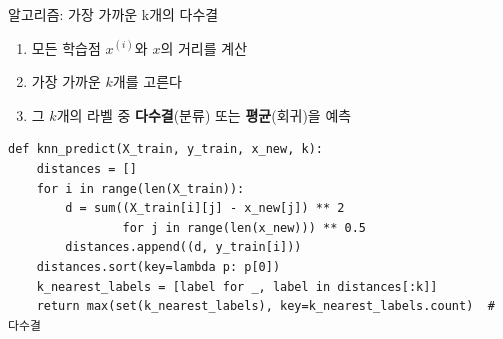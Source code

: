\begin{frame}[fragile]{알고리즘: 가장 가까운 k개의 다수결}
  \begin{enumerate}\small
    \item 모든 학습점 $x^{(i)}$와 $x$의 거리를 계산
    \item 가장 가까운 $k$개를 고른다
    \item 그 $k$개의 라벨 중 \textbf{다수결}(분류) 또는
      \textbf{평균}(회귀)을 예측
  \end{enumerate}
\begin{lstlisting}
def knn_predict(X_train, y_train, x_new, k):
    distances = []
    for i in range(len(X_train)):
        d = sum((X_train[i][j] - x_new[j]) ** 2
                for j in range(len(x_new))) ** 0.5
        distances.append((d, y_train[i]))
    distances.sort(key=lambda p: p[0])
    k_nearest_labels = [label for _, label in distances[:k]]
    return max(set(k_nearest_labels), key=k_nearest_labels.count)  # 다수결
\end{lstlisting}
\end{frame}
